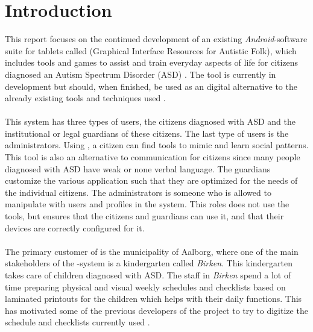 \chapter{Introduction}
\label{cha:introduction}

This report focuses on the continued development of an existing \emph{Android}-software suite for tablets called \giraf (Graphical Interface Resources for Autistic Folk), which includes tools and games to assist and train everyday aspects of life for citizens diagnosed an Autism Spectrum Disorder (ASD) \parencite{asd}. The tool is currently in development but should, when finished, be used as an digital alternative to the already existing tools and techniques used \parencite{birken_slides}.
\\\\ 
This system has three types of users, the citizens diagnosed with ASD and the institutional or legal guardians of these citizens. The last type of users is the administrators. Using \giraf, a citizen can find tools to mimic and learn social patterns. This tool is also an alternative to communication for citizens since many people diagnosed with ASD have weak or none verbal language. The guardians customize the various application such that they are optimized for the needs of the individual citizens. The administrators is someone who is allowed to manipulate with users and profiles in the system. This roles does not use the tools, but ensures that the citizens and guardians can use it, and that their devices are correctly configured for it. 
\\\\
The primary customer of \giraf is the municipality of Aalborg, where one of the main stakeholders of the \giraf-system is a kindergarten called \emph{Birken}. This kindergarten takes care of children diagnosed with ASD. The staff in \emph{Birken} spend a lot of time preparing physical and visual weekly schedules and checklists based on laminated printouts for the children which helps with their daily functions. This has motivated some of the previous developers of the \giraf project to try to digitize the schedule and checklists currently used \parencite{birken_slides}.



